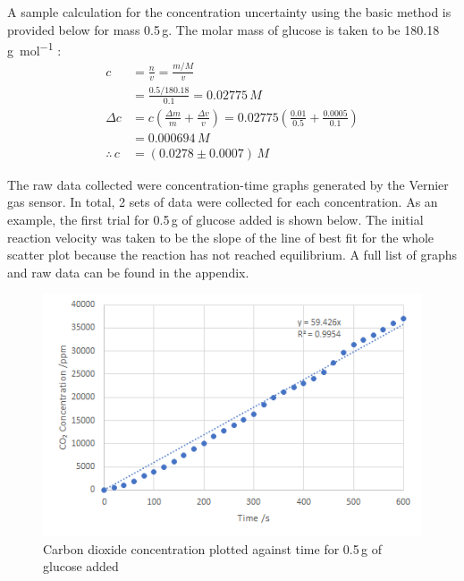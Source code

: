 \documentclass{article}
\begin{document}
A sample calculation for the concentration uncertainty using the basic method is provided below for mass 0.5\,\si{g}. The molar mass of glucose is taken to be 180.18\,\si{g.mol^{-1}} \parencite{ref}:
\begin{align*}
    c &= \frac{n}{v} = \frac{m/M}{v} \\
    &= \frac{0.5/180.18}{0.1} = 0.02775\,\si{M} \\  %
    \Delta c &= c\left(\frac{\Delta m}{m} + \frac{\Delta v}{v}\right) = 0.02775\left(\frac{0.01}{0.5} + \frac{0.0005}{0.1}\right) \\
    &= 0.000694\,\si{M} \\
    \therefore\,c &= (0.0278 \pm 0.0007)\,\si{M}
\end{align*}

The raw data collected were concentration-time graphs generated by the Vernier  gas sensor. In total, 2 sets of data were collected for each concentration. As an example, the first trial for 0.5\,\si{g} of glucose added is shown below. The initial reaction velocity was taken to be the slope of the line of best fit for the whole scatter plot because the reaction has not reached equilibrium. A full list of graphs and raw data can be found in the appendix.  %
\begin{figure}[H]
    \renewcommand{\figurename}{Graph}
    \centering
    \includegraphics{figures/graph_02.png}
    \vspace*{-12pt}
    \caption{Carbon dioxide concentration plotted against time for 0.5\,\si{g} of glucose added}
    \label{fig:graph2}
    \renewcommand{\figurename}{Figure}
\end{figure}
\end{document}
